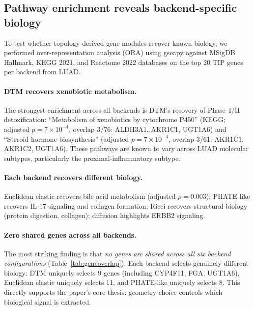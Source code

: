 \documentclass[11pt]{article}
\begin{document}
\subsection{Pathway enrichment reveals backend-specific biology}
\label{sec:enrichment}

To test whether topology-derived gene modules recover known biology, we performed over-representation analysis (ORA) using gseapy \cite{gseapy} against MSigDB Hallmark, KEGG 2021, and Reactome 2022 databases on the top 20 TIP genes per backend from LUAD.

\paragraph{DTM recovers xenobiotic metabolism.}
The strongest enrichment across all backends is DTM's recovery of Phase~I/II detoxification: ``Metabolism of xenobiotics by cytochrome P450'' (KEGG; adjusted $p = 7 \times 10^{-4}$, overlap 3/76: ALDH3A1, AKR1C1, UGT1A6) and ``Steroid hormone biosynthesis'' (adjusted $p = 7 \times 10^{-4}$, overlap 3/61: AKR1C1, AKR1C2, UGT1A6).
These pathways are known to vary across LUAD molecular subtypes, particularly the proximal-inflammatory subtype.

\paragraph{Each backend recovers different biology.}
Euclidean elastic recovers bile acid metabolism (adjusted $p = 0.003$); PHATE-like recovers IL-17 signaling and collagen formation; Ricci recovers structural biology (protein digestion, collagen); diffusion highlights ERBB2 signaling.

\paragraph{Zero shared genes across all backends.}
The most striking finding is that \emph{no genes are shared across all six backend configurations} (Table~\ref{tab:geneoverlap}).
Each backend selects genuinely different biology: DTM uniquely selects 9 genes (including CYP4F11, FGA, UGT1A6), Euclidean elastic uniquely selects 11, and PHATE-like uniquely selects 8.
This directly supports the paper's core thesis: geometry choice controls which biological signal is extracted.
\end{document}
